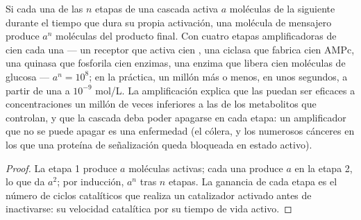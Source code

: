 \begin{theorem}\label{thm:b2:cell-signalling:amplification}
Si cada una de las $n$ etapas de una cascada activa $a$ moléculas de la
siguiente durante el tiempo que dura su propia activación, una molécula
de mensajero produce $a^{n}$ moléculas del producto final. Con cuatro
etapas amplificadoras de cien cada una --- un receptor que activa cien
, una ciclasa que fabrica cien AMPc, una quinasa que fosforila
cien enzimas, una enzima que libera cien moléculas de
glucosa --- $a^{n} = 10^{8}$; en la práctica, un millón más o menos,
en unos segundos, a partir de una  a $10^{-9}$ mol/L. La
amplificación explica que las  puedan ser eficaces a
concentraciones un millón de veces inferiores a las de los metabolitos que
controlan, y que la cascada deba poder apagarse en cada etapa: un
amplificador que no se puede apagar es una enfermedad (el cólera, y los
numerosos cánceres en los que una proteína de señalización queda
bloqueada en estado activo).
\end{theorem}
\begin{proof}
La etapa 1 produce $a$ moléculas activas; cada una produce $a$
en la etapa 2, lo que da $a^{2}$; por inducción, $a^{n}$ tras $n$ etapas.
La ganancia de cada etapa es el número de ciclos catalíticos que realiza
un catalizador activado antes de inactivarse: su velocidad catalítica
por su tiempo de vida activo.
\end{proof}

